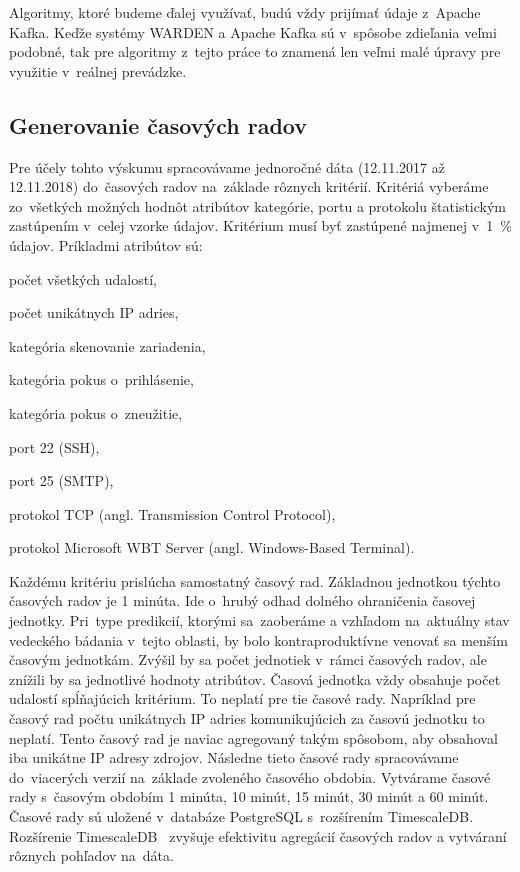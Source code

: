 \documentclass[thesismargins, thesislinespacing, openright, upjsfrontpage]{rnthesis}
\begin{document}
Algoritmy, ktoré budeme ďalej využívať, budú vždy prijímať údaje z~Apache Kafka. Keďže systémy WARDEN a Apache Kafka sú v~spôsobe zdieľania veľmi podobné, tak pre algoritmy z~tejto práce to znamená len veľmi malé úpravy pre využitie v~reálnej prevádzke.

\subsection{Generovanie časových radov}

Pre účely tohto výskumu spracovávame jednoročné dáta (12.11.2017 až 12.11.2018) do~časových radov na~základe rôznych kritérií. Kritériá vyberáme zo~všetkých možných hodnôt atribútov kategórie, portu a protokolu štatistickým zastúpením v~celej vzorke údajov. Kritérium musí byť zastúpené najmenej v~1~\% údajov. Príkladmi atribútov sú: 
\begin{compactenum}
    \item počet všetkých udalostí,
    \item počet unikátnych IP adries,
    \item kategória skenovanie zariadenia,
    \item kategória pokus o~prihlásenie,
    \item kategória pokus o~zneužitie,
    \item port 22 (SSH),
    \item port 25 (SMTP),
    \item protokol TCP (angl. Transmission Control Protocol),
    \item protokol Microsoft WBT Server (angl. Windows-Based Terminal).
\end{compactenum}

Každému kritériu prislúcha samostatný časový rad. Základnou jednotkou týchto časových radov je 1 minúta. Ide o~hrubý odhad dolného ohraničenia časovej jednotky. Pri~type predikcií, ktorými sa~zaoberáme a vzhľadom na~aktuálny stav vedeckého bádania v~tejto oblasti, by bolo kontraproduktívne venovať sa menším časovým jednotkám. Zvýšil by sa počet jednotiek v~rámci časových radov, ale znížili by sa jednotlivé hodnoty atribútov. Časová jednotka vždy obsahuje počet udalostí spĺňajúcich kritérium. To neplatí pre tie časové rady. Napríklad pre časový rad počtu unikátnych IP adries komunikujúcich za časovú jednotku to neplatí. Tento časový rad je naviac agregovaný takým spôsobom, aby obsahoval iba unikátne IP adresy zdrojov. Následne tieto časové rady spracovávame do~viacerých verzií na~základe zvoleného časového obdobia. Vytvárame časové rady s~časovým obdobím 1 minúta, 10 minút, 15 minút, 30 minút a 60 minút. Časové rady sú uložené v~databáze PostgreSQL s~rozšírením TimescaleDB. Rozšírenie TimescaleDB~\cite{timescaledb2020postgresql} zvyšuje efektivitu agregácií časových radov a vytváraní rôznych pohľadov na~dáta.
\end{document}
